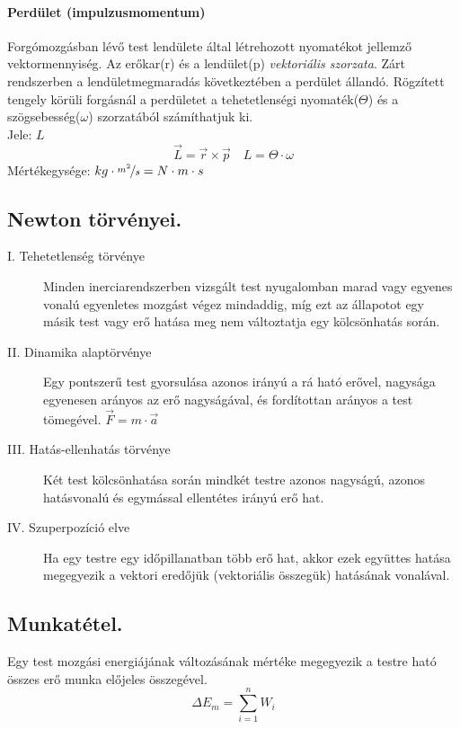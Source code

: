 \paragraph{Perdület (impulzusmomentum)} Forgómozgásban lévő test lendülete által létrehozott nyomatékot jellemző vektormennyiség. Az erőkar(r) és a lendület(p) \emph{vektoriális szorzata}. Zárt rendszerben a lendületmegmaradás következtében a perdület állandó. Rögzített tengely körüli forgásnál a perdületet a tehetetlenségi nyomaték($\Theta$) és a szögsebesség($\omega$) szorzatából számíthatjuk ki.\\
Jele: $L$	$$\vec{L}=\vec{r}\times\vec{p}\quad L=\Theta \cdot \omega$$
Mértékegysége: $kg\cdot \nicefrac{m^2}{s} = N \cdot m \cdot s$

\subsection{Newton törvényei.}
\begin{description}
	\item[I. Tehetetlenség törvénye] Minden inerciarendszerben vizsgált test nyugalomban marad vagy egyenes vonalú egyenletes mozgást végez mindaddig, míg ezt az állapotot egy másik test vagy erő hatása meg nem változtatja egy kölcsönhatás során.

	\item[II. Dinamika alaptörvénye] Egy pontszerű test gyorsulása azonos irányú a rá ható erővel, nagysága egyenesen arányos az erő nagyságával, és fordítottan arányos a test tömegével. $\vec{F}=m \cdot \vec{a}$

	\item[III. Hatás-ellenhatás törvénye] Két test kölcsönhatása során mindkét testre azonos nagyságú, azonos hatásvonalú és egymással ellentétes irányú erő hat.

	\item[IV. Szuperpozíció elve] Ha egy testre egy időpillanatban több erő hat, akkor ezek együttes hatása megegyezik a vektori eredőjük (vektoriális összegük) hatásának vonalával.
\end{description}

\subsection{Munkatétel.}
\begin{theorem}
	Egy test mozgási energiájának változásának mértéke megegyezik a testre ható összes erő munka előjeles összegével.
	$$\Delta E_m = \sum_{i=1}^{n}W_i$$
\end{theorem}

